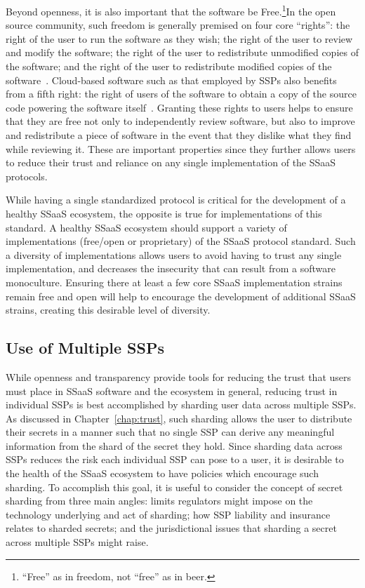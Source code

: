 Beyond openness, it is also important that the software be
Free.\footnote{``Free'' as in freedom, not ``free'' as in beer.}In the
open source community, such freedom is generally premised on four core
``rights'': the right of the user to run the software as they wish;
the right of the user to review and modify the software; the right of
the user to redistribute unmodified copies of the software; and the
right of the user to redistribute modified copies of the
software~\cite{fsf-freedoms}. Cloud-based software such as that
employed by SSPs also benefits from a fifth right: the right of users
of the software to obtain a copy of the source code powering the
software itself~\cite{agpl}. Granting these rights to users helps to
ensure that they are free not only to independently review software,
but also to improve and redistribute a piece of software in the event
that they dislike what they find while reviewing it. These are
important properties since they further allows users to reduce their
trust and reliance on any single implementation of the SSaaS
protocols.

While having a single standardized protocol is critical for the
development of a healthy SSaaS ecosystem, the opposite is true for
implementations of this standard. A healthy SSaaS ecosystem should
support a variety of implementations (free/open or proprietary) of the
SSaaS protocol standard. Such a diversity of implementations allows
users to avoid having to trust any single implementation, and
decreases the insecurity that can result from a software
monoculture. Ensuring there at least a few core SSaaS implementation
strains remain free and open will help to encourage the development of
additional SSaaS strains, creating this desirable level of diversity.

\subsection{Use of Multiple SSPs}

While openness and transparency provide tools for reducing the trust
that users must place in SSaaS software and the ecosystem in general,
reducing trust in individual SSPs is best accomplished by sharding
user data across multiple SSPs. As discussed in
Chapter~\ref{chap:trust}, such sharding allows the user to distribute
their secrets in a manner such that no single SSP can derive any
meaningful information from the shard of the secret they hold. Since
sharding data across SSPs reduces the risk each individual SSP can
pose to a user, it is desirable to the health of the SSaaS ecosystem
to have policies which encourage such sharding. To accomplish this
goal, it is useful to consider the concept of secret sharding from
three main angles: limits regulators might impose on the technology
underlying and act of sharding; how SSP liability and insurance
relates to sharded secrets; and the jurisdictional issues that
sharding a secret across multiple SSPs might raise.

